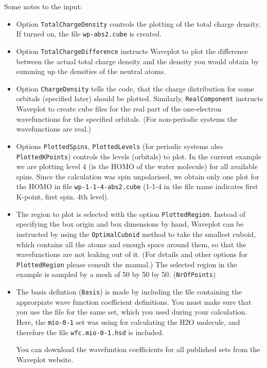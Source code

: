 Some notes to the input:
\begin{itemize}
\item Option \verb|TotalChargeDensity| controls the plotting of the total charge
  density. If turned on, the file \verb|wp-abs2.cube| is created.

\item Option \verb|TotalChargeDifference| instructs Waveplot to plot
  the difference between the actual total charge density and the
  density you would obtain by summing up the densities of the neutral
  atoms.

\item Option \verb|ChargeDensity| tells the code, that the charge distribution
  for some orbitals (specified later) should be plotted. Similarly,
  \verb|RealComponent| instructs Waveplot to create cube files for the real part
  of the one-electron wavefunctions for the specified orbitals. (For
  non-periodic systems the wavefunctions are real.)

\item Options \verb|PlottedSpins|, \verb|PlottedLevels| (for periodic
  systems also \verb|PlottedKPoints|) controls the levels (orbitals) to
  plot.
  In the current example we are plotting level 4 (is the HOMO
  of the water molecule) for all available spins. Since the
  \dftbp{} calculation was spin unpolarised, we obtain only one plot
  for the HOMO in file \verb|wp-1-1-4-abs2.cube| (1-1-4 in the file
  name indicates first K-point, first spin, 4th level).

\item The region to plot is selected with the option
  \verb|PlottedRegion|. Instead of specifying the box origin and box
  dimensions by hand, Waveplot can be instructed by using the
  \verb|OptimalCuboid| method to take the smallest cuboid, which
  contains all the atoms and enough space around them, so that the
  wavefunctions are not leaking out of it. (For details and other
  options for \verb|PlottedRegion| please consult the manual.)  The
  selected region in the example is sampled by a mesh of 50 by 50 by
  50.  (\verb|NrOfPoints|)

\item The basis defintion (\verb|Basis|) is made by including the file
  containing the approrpiate wave function coefficient definitions.
  You must make sure that you use the file for the same set, which you
  used during your \dftbp{} calculation. Here, the \verb|mio-0-1| set
  was using for calculating the H2O molecule, and therefore the file
  \verb|wfc.mio-0-1.hsd| is included.  

  You can download the wavefuntion coefficients for all published sets
  from the Waveplot website.
\end{itemize}


